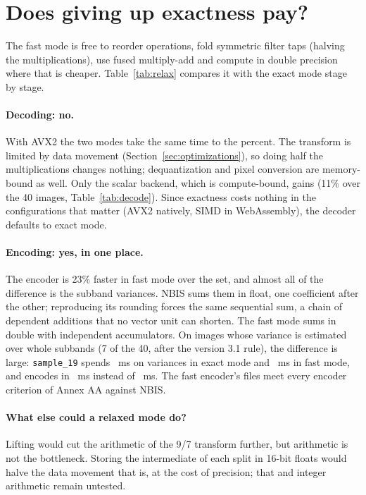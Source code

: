 \section{Does giving up exactness pay?}
\label{sec:relaxation}



The fast mode is free to reorder operations, fold symmetric filter taps (halving the
multiplications), use fused multiply-add and compute in double precision where that is cheaper.
Table~\ref{tab:relax} compares it with the exact mode stage by stage.



\paragraph*{Decoding: no.} With AVX2 the two modes take the same time to the percent. The
transform is limited by data movement (Section~\ref{sec:optimizations}), so doing half the
multiplications changes nothing; dequantization and pixel conversion are memory-bound as well.
Only the scalar backend, which is compute-bound, gains (11\% over the 40 images,
Table~\ref{tab:decode}). Since exactness costs nothing in the configurations that matter
(AVX2 natively, SIMD in WebAssembly), the decoder defaults to exact mode.

\paragraph*{Encoding: yes, in one place.} The encoder is 23\% faster in fast mode over the set,
and almost all of the difference is the subband variances. NBIS sums them in float, one
coefficient after the other; reproducing its rounding forces the same sequential sum, a chain
of dependent additions that no vector unit can shorten. The fast mode sums in double with
independent accumulators. On images whose variance is estimated over whole subbands (7 of the
40, after the version 3.1 rule), the difference is large: \texttt{sample\_19} spends
\varexact~ms on variances in exact mode and \varfast~ms in fast mode, and encodes in \encfast~ms
instead of \encexact~ms. The fast encoder's files meet every encoder criterion of Annex AA
against NBIS.

\paragraph*{What else could a relaxed mode do?} Lifting would cut the arithmetic of the 9/7
transform further, but arithmetic is not the bottleneck. Storing the intermediate of each split
in 16-bit floats would halve the data movement that is, at the cost of precision; that and
integer arithmetic remain untested.
